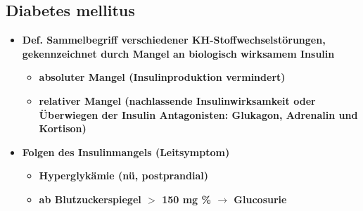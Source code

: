 \subsection{Diabetes mellitus}
	\begin{itemize}
		\item \textbf{Def. Sammelbegriff verschiedener KH-Stoffwechselstörungen, gekennzeichnet durch Mangel an biologisch wirksamem Insulin}
			\begin{itemize}
				\item \textbf{absoluter Mangel (Insulinproduktion vermindert)}
				\item \textbf{relativer Mangel (nachlassende Insulinwirksamkeit oder Überwiegen der Insulin Antagonisten: Glukagon, Adrenalin und Kortison)}
			\end{itemize}
		\item \textbf{Folgen des Insulinmangels (Leitsymptom)}
			\begin{itemize}
				\item \textbf{Hyperglykämie (nü, postprandial)}
				\item \textbf{ab Blutzuckerspiegel $>$ 150 mg \% $\rightarrow$ Glucosurie}
			\end{itemize}
	\end{itemize}
